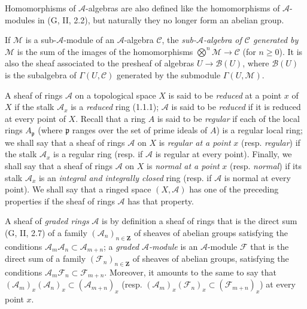 \begin{env}[4.1.3]
Homomorphisms of $\mathcal{A}$-algebras are also defined like the
homomorphisms of $\mathcal{A}$-modules in (G, II, 2.2), but naturally
they no longer form an abelian group.

If $\mathcal{M}$ is a sub-$\mathcal{A}$-module of an
$\mathcal{A}$-algebra $\mathcal{C}$, the \emph{sub-$\mathcal{A}$-algebra of
$\mathcal{C}$ generated by $\mathcal{M}$} is the sum of the images of the
homomorphisms $\bigotimes^n\mathcal{M}\to\mathcal{C}$ (for
$n\geqslant 0$). It is also the sheaf associated to the presheaf of algebras
$U\to\mathcal{B}(U)$, where $\mathcal{B}(U)$ is the subalgebra
of $\Gamma(U,\mathcal{C})$ generated by the submodule
$\Gamma(U,\mathcal{M})$.
\end{env}

\begin{env}[4.1.4]
\label{0.4.1.4}
A sheaf of rings $\mathcal{A}$ on a topological space $X$ is said to be
\emph{reduced} at a point $x$ of $X$ if the stalk $\mathcal{A}_x$ is a
\emph{reduced} ring (1.1.1); $\mathcal{A}$ is said to be \emph{reduced}
if it is reduced at every point of $X$. Recall that a ring $A$ is said to be
\emph{regular} if each of the local rings $A_{\mathfrak p}$ (where
$\mathfrak p$ ranges over the set of prime ideals of $A$) is a regular
local ring; we shall say that a sheaf of rings $\mathcal{A}$ on $X$
is \emph{regular at a point} $x$ (resp. \emph{regular}) if the stalk
$\mathcal{A}_x$ is a regular ring (resp. if $\mathcal{A}$ is regular
at every point). Finally, we shall say that a sheaf of rings $\mathcal{A}$ on
$X$ is \emph{normal at a point} $x$ (resp. \emph{normal}) if its stalk
$\mathcal{A}_x$ is an \emph{integral and integrally closed} ring (resp. if
$\mathcal{A}$ is normal at every point). We shall say that a ringed space
$(X,\mathcal{A})$ has one of the preceding properties if the sheaf of rings
$\mathcal{A}$ has that property.

A sheaf of \emph{graded rings} $\mathcal{A}$ is by definition a
sheaf of rings that is the direct sum (G, II, 2.7) of a family
$(\mathcal{A}_n)_{n\in\mathbf Z}$ of sheaves of abelian groups satisfying the
conditions $\mathcal{A}_m\mathcal{A}_n\subset\mathcal{A}_{m+n}$; a
\emph{graded $\mathcal{A}$-module} is an $\mathcal{A}$-module
$\mathcal{F}$ that is the direct sum of a family
$(\mathcal{F}_n)_{n\in\mathbf Z}$ of sheaves of abelian groups,
satisfying the conditions
$\mathcal{A}_m\mathcal{F}_n\subset\mathcal{F}_{m+n}$. Moreover, it amounts
to the same to say that
$(\mathcal{A}_m)_x(\mathcal{A}_n)_x\subset(\mathcal{A}_{m+n})_x$
(resp.
$(\mathcal{A}_m)_x(\mathcal{F}_n)_x\subset(\mathcal{F}_{m+n})_x$)
at every point $x$.
\end{env}

